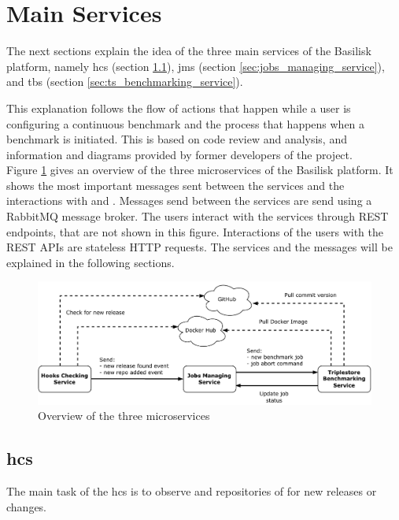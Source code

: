 \section{Main Services}
\label{sec:main_services}
The next sections explain the idea of the three main services of the Basilisk platform, namely \acf{hcs} (section \ref{sec:hooks_checking_service}), \acf{jms} (section \ref{sec:jobs_managing_service}), and \acf{tbs} (section \ref{sec:ts_benchmarking_service}).

This explanation follows the flow of actions that happen while a user is configuring a continuous benchmark and the process that happens when a benchmark is initiated. This is based on code review and analysis, and information and diagrams provided by former developers of the project.
\\

Figure \ref{fig:basilisk_high_level_design_approach} gives an overview of the three microservices of the Basilisk platform.
It shows the most important messages sent between the services and the interactions with \gh{} and \dockh{}.
Messages send between the services are send using a RabbitMQ message broker.
The users interact with the services through REST endpoints, that are not shown in this figure.
Interactions of the users with the REST APIs are stateless HTTP requests.
The services and the messages will be explained in the following sections.

\begin{figure}[tbph]
	\centering
	\includegraphics[width=1\textwidth]{figures/high-level-design-approach.pdf}
	\caption{Overview of the three microservices}
	\label{fig:basilisk_high_level_design_approach}
\end{figure}



\subsection{\acl{hcs}}
\label{sec:hooks_checking_service}
The main task of the \ac{hcs} is to observe \gh{} and \dockh{} repositories of \tsp{} for new releases or changes.

